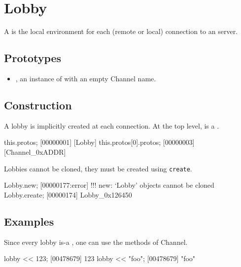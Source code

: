
\section{Lobby}

A  is the local environment for each (remote or local)
connection to an \urbi server.

\subsection{Prototypes}
\begin{itemize}
\item {}, an instance of 
  with an empty Channel name.
\end{itemize}

\subsection{Construction}

A lobby is implicitly created at each connection. At the top level,
\this is a .

\begin{urbiscript}
this.protos;
[00000001] [Lobby]
this.protos[0].protos;
[00000003] [Channel_0xADDR]
\end{urbiscript}

Lobbies cannot be cloned, they must be created using
\lstinline|create|.

\begin{urbiscript}
Lobby.new;
[00000177:error] !!! new: `Lobby' objects cannot be cloned
Lobby.create;
[00000174] Lobby_0x126450
\end{urbiscript}


\subsection{Examples}

Since every lobby is-a , one can use the methods of
Channel.

\begin{urbiscript}
lobby << 123;
[00478679] 123
lobby << "foo";
[00478679] "foo"
\end{urbiscript}

